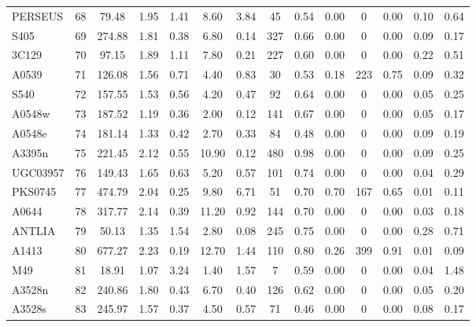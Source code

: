 \documentclass[10pt,aps,pra,reprint,amsmath,amsfonts,amssymb,showpacs,nofootinbib,floatfix]{revtex4-1}
\newcommand{\vst}{\vspace{-0.14mm}}
\begin{document}
\begin{table}
\begin{minipage}{2.0\columnwidth}
\begin{tabular}{l  c c c c c c c c c c c c c}
PERSEUS  &  68 &  79.48 &   1.95 &   1.41 &   8.60 &   3.84 &  45 &   0.54 &   0.00 &    0 &   0.00 &   0.10 &   0.64 \vst \\
S405     &  69 & 274.88 &   1.81 &   0.38 &   6.80 &   0.14 & 327 &   0.66 &   0.00 &    0 &   0.00 &   0.09 &   0.17 \vst \\
3C129    &  70 &  97.15 &   1.89 &   1.11 &   7.80 &   0.21 & 227 &   0.60 &   0.00 &    0 &   0.00 &   0.22 &   0.51 \vst \\
A0539    &  71 & 126.08 &   1.56 &   0.71 &   4.40 &   0.83 &  30 &   0.53 &   0.18 &  223 &   0.75 &   0.09 &   0.32 \vst \\
S540     &  72 & 157.55 &   1.53 &   0.56 &   4.20 &   0.47 &  92 &   0.64 &   0.00 &    0 &   0.00 &   0.05 &   0.25 \vst \\
A0548w   &  73 & 187.52 &   1.19 &   0.36 &   2.00 &   0.12 & 141 &   0.67 &   0.00 &    0 &   0.00 &   0.05 &   0.17 \vst \\
A0548e   &  74 & 181.14 &   1.33 &   0.42 &   2.70 &   0.33 &  84 &   0.48 &   0.00 &    0 &   0.00 &   0.09 &   0.19 \vst \\
A3395n   &  75 & 221.45 &   2.12 &   0.55 &  10.90 &   0.12 & 480 &   0.98 &   0.00 &    0 &   0.00 &   0.09 &   0.25 \vst \\
UGC03957 &  76 & 149.43 &   1.65 &   0.63 &   5.20 &   0.57 & 101 &   0.74 &   0.00 &    0 &   0.00 &   0.04 &   0.29 \vst \\
PKS0745  &  77 & 474.79 &   2.04 &   0.25 &   9.80 &   6.71 &  51 &   0.70 &   0.70 &  167 &   0.65 &   0.01 &   0.11 \vst \\
A0644    &  78 & 317.77 &   2.14 &   0.39 &  11.20 &   0.92 & 144 &   0.70 &   0.00 &    0 &   0.00 &   0.03 &   0.18 \vst \\
ANTLIA   &  79 &  50.13 &   1.35 &   1.54 &   2.80 &   0.08 & 245 &   0.75 &   0.00 &    0 &   0.00 &   0.28 &   0.71 \vst \\
A1413    &  80 & 677.27 &   2.23 &   0.19 &  12.70 &   1.44 & 110 &   0.80 &   0.26 &  399 &   0.91 &   0.01 &   0.09 \vst \\
M49      &  81 &  18.91 &   1.07 &   3.24 &   1.40 &   1.57 &   7 &   0.59 &   0.00 &    0 &   0.00 &   0.04 &   1.48 \vst \\
A3528n   &  82 & 240.86 &   1.80 &   0.43 &   6.70 &   0.40 & 126 &   0.62 &   0.00 &    0 &   0.00 &   0.05 &   0.20 \vst \\
A3528s   &  83 & 245.97 &   1.57 &   0.37 &   4.50 &   0.57 &  71 &   0.46 &   0.00 &    0 &   0.00 &   0.08 &   0.17 \vst \\

\end{tabular}
\end{minipage}
\end{table}
\end{document}
